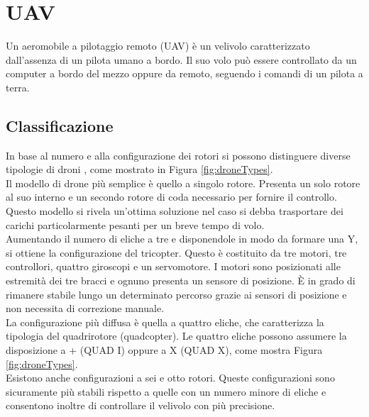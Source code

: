 
\chapter{UAV}\label{ch:uav}
Un aeromobile a pilotaggio remoto (\acs{UAV}) è un velivolo caratterizzato dall'assenza di un pilota umano a bordo. Il suo volo può essere controllato da un computer a bordo del mezzo oppure da remoto, seguendo i comandi di un pilota a terra.


\section{Classificazione}
In base al numero e alla configurazione dei rotori si possono distinguere diverse tipologie di droni \cite{droneClass}, come mostrato in Figura \ref{fig:droneTypes}.\\

Il modello di drone più semplice è quello a singolo rotore. Presenta un solo rotore al suo interno e un secondo rotore di coda necessario per fornire il controllo. Questo modello si rivela un'ottima soluzione nel caso si debba trasportare dei carichi particolarmente pesanti per un breve tempo di volo.\\

Aumentando il numero di eliche a tre e disponendole in modo da formare una Y, si ottiene la configurazione del tricopter. Questo è costituito da tre motori, tre controllori, quattro giroscopi e un servomotore. I motori sono posizionati alle estremità dei tre bracci e ognuno presenta un sensore di posizione. È in grado di rimanere stabile lungo un determinato percorso grazie ai sensori di posizione e non necessita di correzione manuale.\\

La configurazione più diffusa è quella a quattro eliche, che caratterizza la tipologia del quadrirotore (quadcopter). Le quattro eliche possono assumere la disposizione a + (QUAD I) oppure a X (QUAD X), come mostra Figura \ref{fig:droneTypes}.\\

Esistono anche configurazioni a sei e otto rotori. Queste configurazioni sono sicuramente più stabili rispetto a quelle con un numero minore di eliche e consentono inoltre di controllare il velivolo con più precisione.

